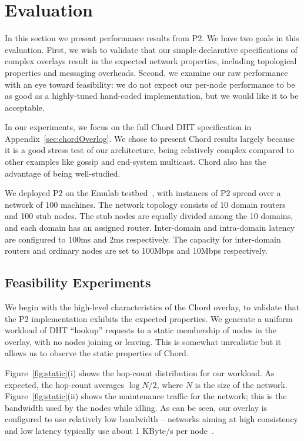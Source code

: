 \documentclass{sig-alt-full}
\def\Sys{P2\xspace}
\begin{document}
\section{Evaluation}
\label{sec:evaluation}
In this section we present performance results from \Sys.  We have two
goals 
in this evaluation.  First, we wish to validate that our simple
declarative specifications of complex overlays result in the expected
network properties, including topological properties and messaging
overheads.  Second, we examine our raw performance with an eye toward
feasibility: we do not expect our per-node performance to be as
good as a highly-tuned hand-coded implementation, but we would like it to be 
acceptable.

In our experiments, we focus on the full Chord DHT specification
in Appendix~\ref{sec:chordOverlog}.  
We chose to present Chord results largely because it is a good stress
test of our architecture, being relatively complex compared to other
examples like gossip and end-system multicast.  Chord also has the
advantage of being well-studied. 

We deployed \Sys on the Emulab testbed~\cite{White+:osdi02},
with instances of \Sys spread over a
network of 100 machines.  The network topology consists of 10
domain routers and 100 stub nodes. The stub nodes are equally divided
among the 10 domains, and each domain has an assigned router. Inter-domain and
intra-domain latency are configured to 100ms and 2ms respectively. The
capacity for inter-domain routers and ordinary nodes are set to 100Mbps and 10Mbps
respectively.



\subsection{Feasibility Experiments}
We begin with the
high-level characteristics of the Chord overlay, to validate that the \Sys
implementation exhibits the expected properties. We generate
a uniform workload of DHT ``lookup'' requests to a static membership
of nodes in the overlay, with no nodes joining or leaving.  This is
somewhat unrealistic but it allows us to observe the static properties
of Chord.

Figure~\ref{fig:static}(i) shows the hop-count distribution for our
workload.  As expected, the 
hop-count averages $\log N/2$, where $N$ is the size of the network.
Figure~\ref{fig:static}(ii) shows the maintenance traffic for the
network; this is the bandwidth used by the nodes while idling.  As can
be seen, our overlay is configured to use relatively low bandwidth --
networks aiming at high consistency and low latency typically use
about 1 KByte/s per node~\cite{rhea_usenix_2004}. 
\end{document}
